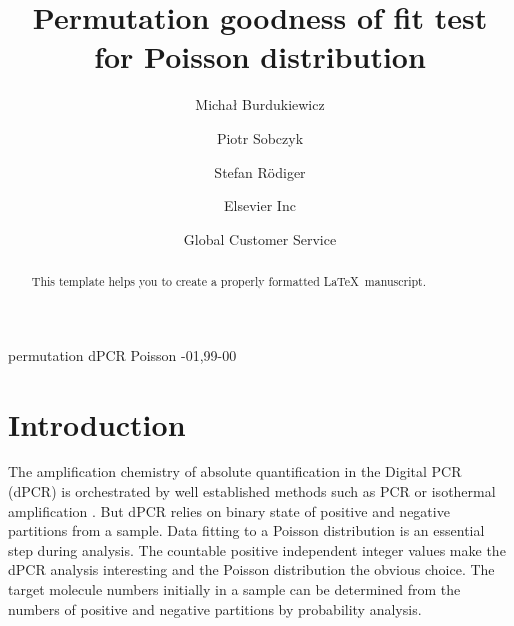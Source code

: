 \documentclass[review]{elsarticle}
\begin{document}
\begin{frontmatter}

\title{Permutation goodness of fit test for Poisson distribution}

\author{Micha\l{} Burdukiewicz}
\address{Radarweg 29, Amsterdam}

\author{Piotr Sobczyk}
\address{Radarweg 29, Amsterdam}

\author{Stefan R\"{o}diger}
\address{Radarweg 29, Amsterdam}

\author[mymainaddress,mysecondaryaddress]{Elsevier Inc}

\author[mysecondaryaddress]{Global Customer Service}

\address[mymainaddress]{1600 John F Kennedy Boulevard, Philadelphia}
\address[mysecondaryaddress]{360 Park Avenue South, New York}

\begin{abstract}
This template helps you to create a properly formatted \LaTeX\ manuscript.
\end{abstract}

\begin{keyword}
permutation dPCR Poisson
-01\sep  99-00
\end{keyword}

\end{frontmatter}

\linenumbers

\section{Introduction}

The amplification chemistry of absolute quantification in the Digital PCR (dPCR) 
is orchestrated by well established methods such as PCR or isothermal 
amplification \cite{pabinger_survey_2014, morley_digital_2014}. But dPCR relies 
on binary state of positive and negative partitions from a sample. Data fitting 
to a Poisson distribution is an essential step during analysis. The countable 
positive independent integer values make the dPCR analysis interesting and the 
Poisson distribution the obvious choice. The target molecule numbers initially 
in a sample can be determined from the numbers of positive and negative 
partitions by probability analysis.
\end{document}
